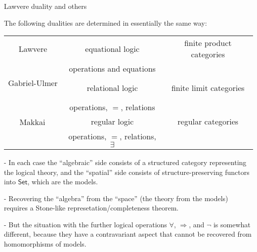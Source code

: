 \documentclass{beamer}
\newcommand{\Set}{\mathsf{Set}}
\begin{document}
\begin{frame}{Lawvere duality and others}

The following dualities are determined in essentially the same way:

\begin{center}
\begin{tabular}{c|c|c}
Lawvere & equational logic & finite product categories \\
& operations and equations & \\
\hline
Gabriel-Ulmer$^{\strut}$ & relational logic & finite limit categories \\
& operations, $=$, relations &  \\
\hline
Makkai$^{\strut}$ & regular logic & regular categories \\
& operations, $=$, relations, $\exists$ & \\
\end{tabular}
\end{center}


- In each case the ``algebraic'' side consists of a structured category representing the logical theory, and the ``spatial'' side consists of structure-preserving functors into $\Set$, which are the models.
\smallskip

- Recovering the ``algebra'' from the ``space'' (the theory from the models) requires a Stone-like represetation/completeness theorem.
\smallskip

- But the situation with the further logical operations $\forall$, $\Rightarrow$, and $\neg$ is somewhat different, because they have a contravariant aspect that cannot be recovered from homomorphisms of models.

\end{frame}
\end{document}
